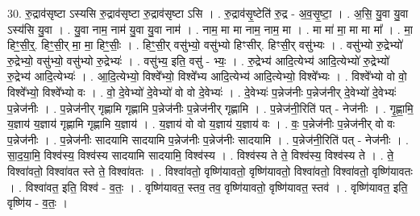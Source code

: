 \documentclass[17pt]{extarticle}
\begin{document}
30. रु॒द्राव॑सृष्टा ऽस्यसि रु॒द्राव॑सृष्टा रु॒द्राव॑सृष्टा ऽसि । . रु॒द्राव॑सृ॒ष्टेति॑ रु॒द्र - अ॒व॒सृ॒ष्टा॒ । . अ॒सि॒ यु॒वा यु॒वा ऽस्य॑सि यु॒वा । . यु॒वा नाम॒ नाम॑ यु॒वा यु॒वा नाम॑ । . नाम॒ मा मा नाम॒ नाम॒ मा । . मा मा॑ मा॒ मा मा मा᳚ । . मा॒ हिꣳ॒॒सी॒र्॒. हिꣳ॒॒सी॒र् मा॒ मा॒ हिꣳ॒॒सीः॒ । . हिꣳ॒॒सी॒र् वसु॑भ्यो॒ वसु॑भ्यो हिꣳसीर्. हिꣳसी॒र् वसु॑भ्यः । . वसु॑भ्यो रु॒द्रेभ्यो॑ रु॒द्रेभ्यो॒ वसु॑भ्यो॒ वसु॑भ्यो रु॒द्रेभ्यः॑ । . वसु॑भ्य॒ इति॒ वसु॑ - भ्यः॒ । . रु॒द्रेभ्य॑ आदि॒त्येभ्य॑ आदि॒त्येभ्यो॑ रु॒द्रेभ्यो॑ रु॒द्रेभ्य॑ आदि॒त्येभ्यः॑ । . आ॒दि॒त्येभ्यो॒ विश्वे᳚भ्यो॒ विश्वे᳚भ्य आदि॒त्येभ्य॑ आदि॒त्येभ्यो॒ विश्वे᳚भ्यः । . विश्वे᳚भ्यो वो वो॒ विश्वे᳚भ्यो॒ विश्वे᳚भ्यो वः । . वो॒ दे॒वेभ्यो॑ दे॒वेभ्यो॑ वो वो दे॒वेभ्यः॑ । . दे॒वेभ्यः॑ प॒न्नेज॑नीः प॒न्नेज॑नीर् दे॒वेभ्यो॑ दे॒वेभ्यः॑ प॒न्नेज॑नीः । . प॒न्नेज॑नीर् गृह्णामि गृह्णामि प॒न्नेज॑नीः प॒न्नेज॑नीर् गृह्णामि । . प॒न्नेज॑नी॒रिति॑ पत् - नेज॑नीः । . गृ॒ह्णा॒मि॒ य॒ज्ञाय॑ य॒ज्ञाय॑ गृह्णामि गृह्णामि य॒ज्ञाय॑ । . य॒ज्ञाय॑ वो वो य॒ज्ञाय॑ य॒ज्ञाय॑ वः । . वः॒ प॒न्नेज॑नीः प॒न्नेज॑नीर् वो वः प॒न्नेज॑नीः । . प॒न्नेज॑नीः सादयामि सादयामि प॒न्नेज॑नीः प॒न्नेज॑नीः सादयामि । . प॒न्नेज॑नी॒रिति॑ पत् - नेज॑नीः । . सा॒द॒या॒मि॒ विश्व॑स्य॒ विश्व॑स्य सादयामि सादयामि॒ विश्व॑स्य । . विश्व॑स्य ते ते॒ विश्व॑स्य॒ विश्व॑स्य ते । . ते॒ विश्वा॑वतो॒ विश्वा॑वत स्ते ते॒ विश्वा॑वतः । . विश्वा॑वतो॒ वृष्णि॑यावतो॒ वृष्णि॑यावतो॒ विश्वा॑वतो॒ विश्वा॑वतो॒ वृष्णि॑यावतः । . विश्वा॑वत॒ इति॒ विश्व॑ - व॒तः॒ । . वृष्णि॑यावत॒ स्तव॒ तव॒ वृष्णि॑यावतो॒ वृष्णि॑यावत॒ स्तव॑ । . वृष्णि॑यावत॒ इति॒ वृष्णि॑य - व॒तः॒ । \newline
\end{document}
